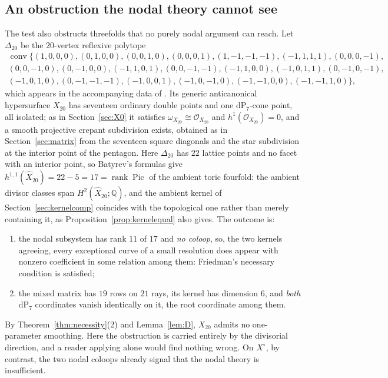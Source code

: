 \documentclass[11pt]{amsart}
\theoremstyle{definition}
\theoremstyle{remark}
\theoremstyle{plain}
\newcommand{\QQ}{\mathbb{Q}}
\newcommand{\cO}{\mathcal{O}}
\newcommand{\conv}{\operatorname{conv}}
\newcommand{\Pic}{\operatorname{Pic}}
\newcommand{\dP}{\mathrm{dP}}
\newcommand{\Xh}{\widehat{X}}
\begin{document}
\subsection{An obstruction the nodal theory cannot see}\label{sec:X20}
The test also obstructs threefolds that no purely nodal argument can
reach.  Let $\Delta_{20}$ be the $20$-vertex reflexive polytope
\[
\begin{gathered}
\conv\{(1,0,0,0),(0,1,0,0),(0,0,1,0),(0,0,0,1),(1,-1,-1,-1),
(-1,1,1,1),(0,0,0,-1),\\
(0,0,-1,0),(0,-1,0,0),(-1,1,0,1),(0,0,-1,-1),(-1,1,0,0),
(-1,0,1,1),(0,-1,0,-1),\\
(-1,0,1,0),(0,-1,-1,-1),(-1,0,0,1),(-1,0,-1,0),(-1,-1,0,0),
(-1,-1,1,0)\},
\end{gathered}
\]
which appears in the accompanying data of \cite{PaperIII}.  Its generic
anticanonical hypersurface $X_{20}$ has seventeen ordinary double
points and one $\dP_7$-cone point, all isolated; as in
Section~\ref{sec:X0} it satisfies
$\omega_{X_{20}}\cong\cO_{X_{20}}$ and $h^1(\cO_{X_{20}})=0$, and a
smooth projective crepant subdivision exists, obtained as in
Section~\ref{sec:matrix} from the seventeen square diagonals and the
star subdivision at the interior point of the pentagon.  Here
$\Delta_{20}$ has $22$ lattice points and no facet with an interior
point, so Batyrev's formulas give
$h^{1,1}(\Xh_{20})=22-5=17=\operatorname{rank}\Pic$ of the ambient
toric fourfold: the ambient divisor classes span
$H^2(\Xh_{20};\QQ)$, and the ambient kernel of
Section~\ref{sec:kernelcomp} coincides with the topological one rather
than merely containing it, as Proposition~\ref{prop:kernelequal} also
gives.  The outcome is:
\begin{enumerate}
\item the nodal subsystem has rank $11$ of $17$ and \emph{no coloop},
so, the two kernels agreeing, every exceptional curve of a small
resolution does appear with nonzero coefficient in some relation among
them: Friedman's necessary condition is satisfied;
\item the mixed matrix has $19$ rows on $21$ rays, its kernel has
dimension $6$, and \emph{both} $\dP_7$ coordinates vanish identically
on it, the root coordinate among them.
\end{enumerate}
By Theorem~\ref{thm:necessity}(2) and Lemma~\ref{lem:D}, $X_{20}$
admits no one-parameter smoothing.  Here the obstruction is carried
entirely by the divisorial direction, and a reader applying
\cite{Friedman86,RT09} alone would find nothing wrong.  On
$X^{\circ}$, by contrast, the two nodal coloops already signal that
the nodal theory is insufficient.
\end{document}
